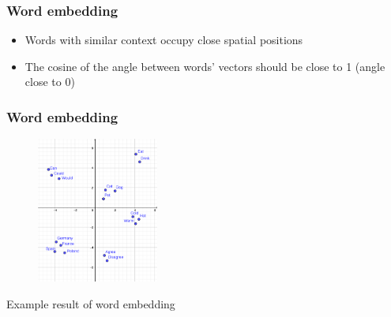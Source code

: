 

\begin{frame}
\frametitle{Word embedding}

	\begin{itemize}
		\item Words with similar context occupy close spatial positions
		\item The cosine of the angle between words' vectors should be close to 1 (angle close to 0)
	\end{itemize}

\end{frame}



\begin{frame}
	\frametitle{Word embedding}

	\begin{figure}
		\includegraphics[width=4cm]{./figures/Groups}

	\end{figure}
		\begin{center}
		{Example result of word embedding}
		\end{center}
	\vspace{-0.5cm}

\end{frame}



